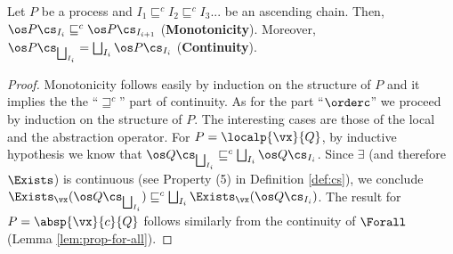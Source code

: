 \documentclass{tlp}
\begin{document}
\begin{proposition}\label{prop:cont-td}
Let $P$ be a process and 
$I_1 \sqsubseteq^c I_2 \sqsubseteq^c I_3 ...$ be an 
ascending chain. Then,  $\os P \cs_{I_{i}} \sqsubseteq^c \os P \cs_{I_{i+1}} $ ({\bf Monotonicity}). Moreover,    $\os P \cs_{\bigsqcup_ {I_i}} =  \bigsqcup_ {I_i} \os P \cs_{I_i} $ ({\bf Continuity}). 
\end{proposition}
\begin{proof}
Monotonicity follows easily by induction on the structure of $P$ and it implies the the  ``$\sqsupseteq^c$'' part of continuity. As for the part ``$\orderc$'' we proceed by induction on the structure of $P$.  The interesting cases are those of the local  and the abstraction operator. For $P=\localp{\vx}{Q}$, by inductive hypothesis we know that $\os Q \cs_{\bigsqcup_ {I_i}} \sqsubseteq^c  \bigsqcup_ {I_i} \os Q \cs_{I_i} $. Since $\exists$ (and therefore $\Exists$) is continuous (see Property (5) in Definition \ref{def:cs}),  we conclude 
$\Exists _{\vx}(  \os Q \cs_{\bigsqcup_ {I_i}}) \sqsubseteq^c   \bigsqcup_ {I_i} \Exists _{\vx} (  \os Q \cs_{I_i}) $.
The result for  $P=\absp{\vx}{c}{Q}$ follows similarly from the continuity of $\Forall$ (Lemma \ref{lem:prop-for-all}). 
\end{proof}
\end{document}
